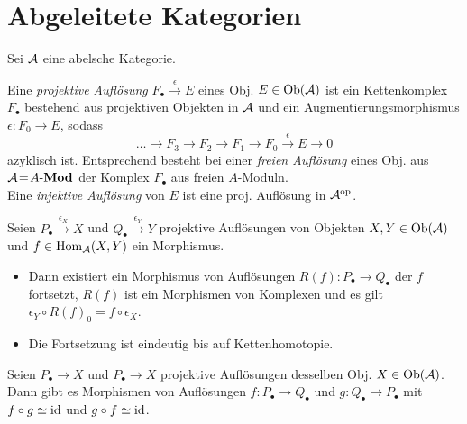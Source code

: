 \documentclass{cheat-sheet}
\newcommand{\CC}[1]{{#1}_{\bullet}} %
\newcommand{\AMod}{\text{$A$-$\Mod$}} %
\begin{document}


\section{Abgeleitete Kategorien}

Sei $\mathcal{A}$ eine abelsche Kategorie.


\begin{defn}
  Eine \emph{projektive Auflösung} $\CC{F} \xrightarrow{\epsilon} E$ eines Obj. $E \in \operatorname{Ob}(\mathcal{A})$ ist ein Kettenkomplex $\CC{F}$ bestehend aus projektiven Objekten in $\mathcal{A}$ und ein Augmentierungsmorphismus $\epsilon : F_0 \to E$, sodass
  \[ \ldots \to F_3 \to F_2 \to F_1 \to F_0 \xrightarrow{\epsilon} E \to 0 \]
  azyklisch ist. Entsprechend besteht bei einer \emph{freien Auflösung} eines Obj. aus $\Aat \!=\! \AMod$ der Komplex $\CC{F}$ aus freien $A$-Moduln. \\
  Eine \emph{injektive Auflösung} von $E$ ist eine proj. Auflösung in $\mathcal{A}^{\mathrm{op}}$.
\end{defn}

\begin{lem}
  Seien $\CC{P} \xrightarrow{\epsilon_X} X$ und $\CC{Q} \xrightarrow{\epsilon_Y} Y$ projektive Auflösungen von Objekten $X, Y \in \operatorname{Ob}(\mathcal{A})$ und $f \in \operatorname{Hom}_{\mathcal{A}}(X, Y)$ ein Morphismus.
  \begin{itemize}
    \item Dann existiert ein Morphismus von Auflösungen $R(f) : \CC{P} \to \CC{Q}$ der $f$ fortsetzt, \dh{} $R(f)$ ist ein Morphismen von Komplexen und es gilt $\epsilon_Y \circ R(f)_0 = f \circ \epsilon_X$.
    \item Die Fortsetzung ist eindeutig bis auf Kettenhomotopie.
  \end{itemize}
\end{lem}

\begin{kor}
  Seien $\CC{P} \to X$ und $\CC{P} \to X$ projektive Auflösungen desselben Obj. $X \in \operatorname{Ob}(\mathcal{A})$. Dann gibt es Morphismen von Auflösungen $f : \CC{P} \to \CC{Q}$ und $g : \CC{Q} \to \CC{P}$ mit $f \circ g \simeq \operatorname{id}$ und $g \circ f \simeq \operatorname{id}$.
\end{kor}

\end{document}
